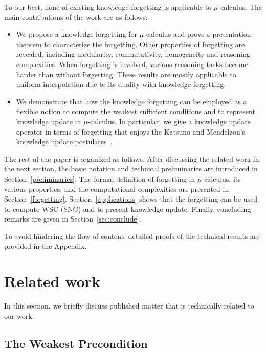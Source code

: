 \documentclass[sn-mathphys]{sn-jnl}%
\theoremstyle{thmstyleone}%
\theoremstyle{thmstyletwo}%
\theoremstyle{thmstylethree}%
\begin{document}
To our best, none of existing knowledge forgetting is applicable to $\mu$-calculus. The main contributions of the work are as follows:
\begin{itemize}
	\item We propose a knowledge forgetting for $\mu$-calculus and prove a presentation theorem to characterize the forgetting.
	Other properties of forgetting are revealed, including modularity, commutativity, homogeneity and reasoning complexities.
	When forgetting is involved, various reasoning tasks become harder than without forgetting.
	These results are mostly applicable to uniform interpolation due to its duality with knowledge forgetting.
	
	\item We demonstrate that how the knowledge forgetting can be employed as a flexible notion 
	to compute the weakest sufficient conditions and to represent knowledge update in $\mu$-calculus. 
	In particular, we give a knowledge update operator in terms of forgetting that 
	enjoys the Katsuno and Mendelzon's knowledge update postulates~\cite{katsuno91mendelzon}.
\end{itemize}

The rest of the paper is organized as follows. 
After discussing the related work in the next section, the basic notation and technical preliminaries are introduced in Section~\ref{preliminaries}. The formal definition of forgetting in $\mu$-calculus,  its various properties, and the computational complexities are presented in Section~\ref{forgetting}.
Section~\ref{applications} shows that the forgetting can be used to compute WSC (SNC) and to present knowledge update.
Finally, concluding remarks are given in Section~\ref{sec:conclude}.

To avoid hindering the flow of content, detailed proofs of the technical results are provided in the Appendix.

\section{Related work}
In this section, we briefly discuss published matter that is technically related to our work.

\subsection{The Weakest Precondition}
\end{document}
